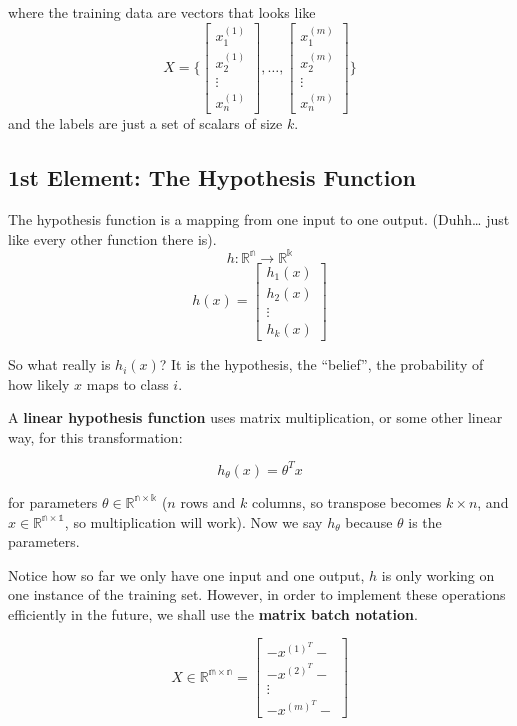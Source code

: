 \documentclass[
  letterpaper,
  DIV=11,
  numbers=noendperiod]{scrreprt}
\begin{document}
where the training data are vectors that looks like
\[X = \{ \begin{bmatrix} x^{(1)}_1 \\ x^{(1)}_2 \\ \vdots \\ x^{(1)}_n \end{bmatrix} , \dots, \begin{bmatrix} x^{(m)}_1 \\ x^{(m)}_2 \\ \vdots \\ x^{(m)}_n \end{bmatrix} \}\]
and the labels are just a set of scalars of size \(k\).

\subsection*{1st Element: The Hypothesis
Function}\label{st-element-the-hypothesis-function}

The hypothesis function is a mapping from one input to one output.
(Duhh\ldots{} just like every other function there is).
\[h: \mathbb{R^n} \rightarrow \mathbb{R^k}\]
\[h(x) = \begin{bmatrix} h_1(x) \\ h_2(x) \\ \vdots \\ h_k(x)\end{bmatrix}\]

So what really is \(h_i(x)\)? It is the hypothesis, the ``belief'', the
probability of how likely \(x\) maps to class \(i\).

A \textbf{linear hypothesis function} uses matrix multiplication, or
some other linear way, for this transformation:

\[h_\theta(x) = \theta^T x\]

for parameters \(\theta \in \mathbb{R^{n \times k}}\) (\(n\) rows and
\(k\) columns, so transpose becomes \(k \times n\), and
\(x \in \mathbb{R^{n \times 1}}\), so multiplication will work). Now we
say \(h_\theta\) because \(\theta\) is the parameters.

Notice how so far we only have one input and one output, \(h\) is only
working on one instance of the training set. However, in order to
implement these operations efficiently in the future, we shall use the
\textbf{matrix batch notation}.

\[X \in \mathbb{R^{m \times n}} = \begin{bmatrix} -x^{(1)^{T}}- \\ -x^{(2)^{T}}- \\ \vdots \\ -x^{(m)^{T}}- \end{bmatrix}\]
\end{document}
